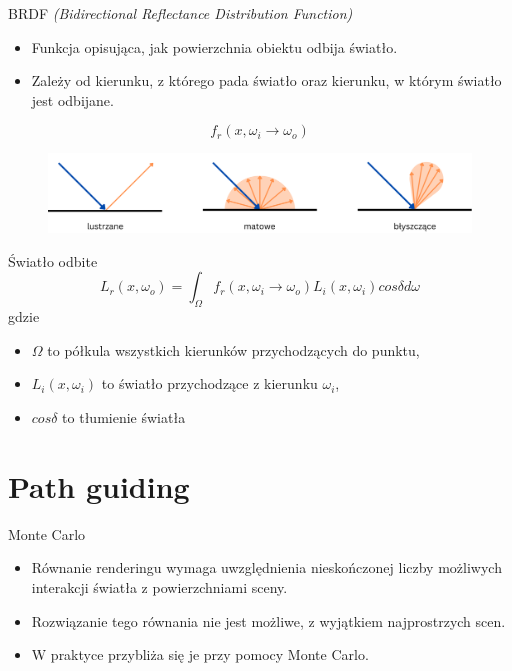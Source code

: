 \documentclass{beamer}
\begin{document}
\begin{frame}{BRDF \it{(Bidirectional Reflectance Distribution Function)}}
    \begin{itemize}
        \item Funkcja opisująca, jak powierzchnia obiektu odbija światło.
        \item Zależy od kierunku, z którego pada światło oraz kierunku, w którym światło jest odbijane.
    \end{itemize}
$$ f_r(x, \omega_i \rightarrow \omega_o) $$
\begin{figure}
    \centering
    \includegraphics[width=1\linewidth]{img/surfaces.png}
    \label{fig:enter-label}
\end{figure}
\end{frame}

\begin{frame}{Światło odbite}
    $$ L_r(x, \omega_o) = \int_{\Omega}f_r(x, \omega_i \rightarrow \omega_o)L_i(x, \omega_i)cos\delta d\omega $$
gdzie
\begin{itemize}
    \item $\Omega$ to półkula wszystkich kierunków przychodzących do punktu,
    \item $L_i(x, \omega_i)$ to światło przychodzące z kierunku $\omega_i$,
    \item $cos\delta$ to tłumienie światła
\end{itemize}
\end{frame}

\section{Path guiding}

\begin{frame}{Monte Carlo}
    \begin{itemize}
        \item Równanie renderingu wymaga uwzględnienia nieskończonej liczby możliwych interakcji światła z powierzchniami sceny.
        \item Rozwiązanie tego równania nie jest możliwe, z wyjątkiem najprostrzych scen.
        \item W praktyce przybliża się je przy pomocy Monte Carlo.
    \end{itemize}
\end{frame}
\end{document}
